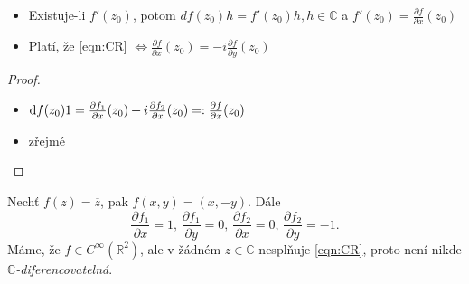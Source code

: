 
\begin{note}\mbox{}
\begin{itemize}
    \item Existuje-li $f'(z_0)$, potom $df(z_0)h = f'(z_0)h, h \in \mathbb{C}$ a $f'(z_0) = \frac{\partial f}{\partial x}(z_0)$ %
    \item Platí, že \cref{eqn:CR}
    $\iff \frac{\partial f}{\partial x}(z_0)    = -i\frac{\partial f}{\partial y}(z_0)$
\end{itemize}
\end{note}

\begin{proof}\mbox{}
\begin{itemize}
    \item $\mathop{}\!\mathrm{d} f(z_0)1 = \frac{\partial f_1}{\partial x}(z_0) + i\frac{\partial f_2}{\partial x}(z_0) =: \frac{\partial f}{\partial x}(z_0)$
    \item zřejmé %
\end{itemize}
\end{proof}

\begin{example}
Nechť $f(z) = \overline{z}$, pak $f(x,y) = (x,-y)$. %
Dále 
$$\frac{\partial f_1}{\partial x} = 1\text{, } \frac{\partial f_1}{\partial y} = 0\text{, } \frac{\partial f_2}{\partial x} = 0\text{, } \frac{\partial f_2}{\partial y} = -1\text{.}$$
Máme, že $f\in C^\infty(\mathbb{R}^2)$, ale v žádném $z\in \mathbb{C}$ nesplňuje \cref{eqn:CR}, proto není nikde\\ $\mathbb{C}$\emph{-diferencovatelná}.
\end{example}
